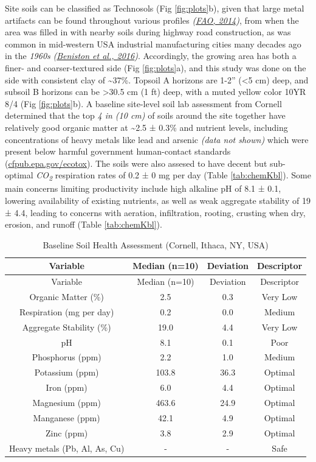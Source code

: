 \documentclass[
  12pt,
]{article}
\begin{document}
Site soils can be classified as Technosols (Fig \ref{fig:plots}b), given that large metal artifacts can be found throughout various profiles \emph{(\protect\hyperlink{ref-fao14}{FAO, 2014})}, from when the area was filled in with nearby soils during highway road construction, as was common in mid-western USA industrial manufacturing cities many decades ago in the \emph{1960s} \emph{(\protect\hyperlink{ref-beniston16}{Beniston et al., 2016})}.
Accordingly, the growing area has both a finer- and coarser-textured side (Fig \ref{fig:plots}a),
and this study was done on the side with consistent clay of \textasciitilde37\%.
Topsoil A horizons are 1-2'' (\textless5 cm) deep, and subsoil B horizons can be \textgreater30.5 cm (1 ft) deep, with a muted yellow color 10YR 8/4 (Fig \ref{fig:plots}b).
A baseline site-level soil lab assessment from Cornell determined that the top \emph{4 in (10 cm)} of soils around the site together have relatively good organic matter at
\textasciitilde2.5 ±
0.3\%
and nutrient levels, including concentrations of heavy metals like lead and arsenic \emph{(data not shown)} which were present below harmful government human-contact standards (\url{cfpub.epa.gov/ecotox}).
The soils were also assesed to have decent but sub-optimal \emph{CO\textsubscript{2}} respiration rates of
0.2 ±
0 mg per day
(Table \ref{tab:chemKbl}).
Some main concerns limiting productivity include high alkaline pH of
8.1 ±
0.1,
lowering availability of existing nutrients, as well as weak aggregate stability of
19 ±
4.4,
leading to concerns with aeration, infiltration, rooting, crusting when dry, erosion, and runoff (Table \ref{tab:chemKbl}).

\begin{longtable}[]{@{}cccc@{}}
\caption{\label{tab:chem}Baseline Soil Health Assessment (Cornell, Ithaca, NY, USA)}\tabularnewline
\toprule
Variable & Median (n=10) & Deviation & Descriptor \\
\midrule
\endfirsthead
\toprule
Variable & Median (n=10) & Deviation & Descriptor \\
\midrule
\endhead
Organic Matter (\%) & 2.5 & 0.3 & Very Low \\
Respiration (mg per day) & 0.2 & 0.0 & Medium \\
Aggregate Stability (\%) & 19.0 & 4.4 & Very Low \\
pH & 8.1 & 0.1 & Poor \\
Phosphorus (ppm) & 2.2 & 1.0 & Medium \\
Potassium (ppm) & 103.8 & 36.3 & Optimal \\
Iron (ppm) & 6.0 & 4.4 & Optimal \\
Magnesium (ppm) & 463.6 & 24.9 & Optimal \\
Manganese (ppm) & 42.1 & 4.9 & Optimal \\
Zinc (ppm) & 3.8 & 2.9 & Optimal \\
Heavy metals (Pb, Al, As, Cu) & - & - & Safe \\
\bottomrule
\end{longtable}
\end{document}
